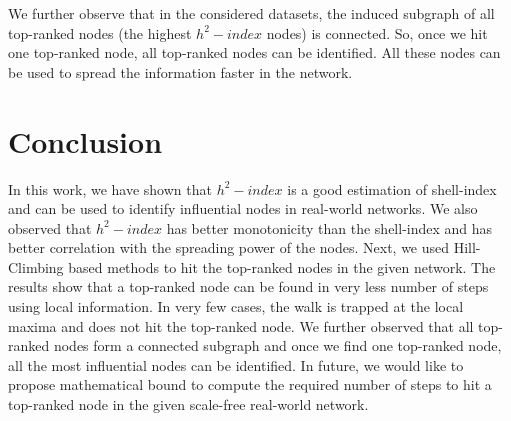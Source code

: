 \documentclass[conference]{IEEEtran}
\begin{document}
We further observe that in the considered datasets, the induced subgraph of all top-ranked nodes (the highest $h^2-index$ nodes) is connected. So, once we hit one top-ranked node, all top-ranked nodes can be identified. All these nodes can be used to spread the information faster in the network.

\section{Conclusion}\label{conclusion}

%

In this work, we have shown that $h^2-index$ is a good estimation of shell-index and can be used to identify influential nodes in real-world networks. 
We also observed that $h^2-index$ has better monotonicity than the shell-index and has better correlation with the spreading power of the nodes.
Next, we used Hill-Climbing based methods to hit the top-ranked nodes in the given network. The results show that a top-ranked node can be found in very less number of steps using local information. In very few cases, the walk is trapped at the local maxima and does not hit the top-ranked node. We further observed that all top-ranked nodes form a connected subgraph and once we find one top-ranked node, all the most influential nodes can be identified. In future, we would like to propose mathematical bound to compute the required number of steps to hit a top-ranked node in the given scale-free real-world network.
\end{document}
